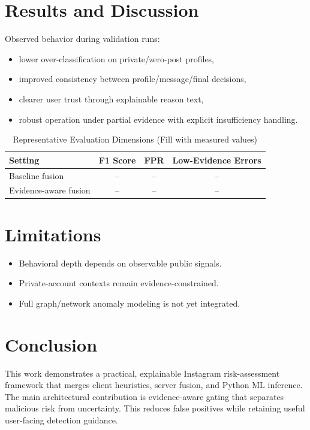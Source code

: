 ﻿\documentclass[conference]{IEEEtran}
\begin{document}
\section{Results and Discussion}
Observed behavior during validation runs:
\begin{itemize}
\item lower over-classification on private/zero-post profiles,
\item improved consistency between profile/message/final decisions,
\item clearer user trust through explainable reason text,
\item robust operation under partial evidence with explicit insufficiency handling.
\end{itemize}

\begin{table}[t]
\caption{Representative Evaluation Dimensions (Fill with measured values)}
\centering
\begin{tabular}{lccc}
\toprule
Setting & F1 Score & FPR & Low-Evidence Errors \\
\midrule
Baseline fusion & -- & -- & -- \\
Evidence-aware fusion & -- & -- & -- \\
\bottomrule
\end{tabular}
\label{tab:eval}
\end{table}

\section{Limitations}
\begin{itemize}
\item Behavioral depth depends on observable public signals.
\item Private-account contexts remain evidence-constrained.
\item Full graph/network anomaly modeling is not yet integrated.
\end{itemize}

\section{Conclusion}
This work demonstrates a practical, explainable Instagram risk-assessment framework that merges client heuristics, server fusion, and Python ML inference. The main architectural contribution is evidence-aware gating that separates malicious risk from uncertainty. This reduces false positives while retaining useful user-facing detection guidance.
\end{document}
